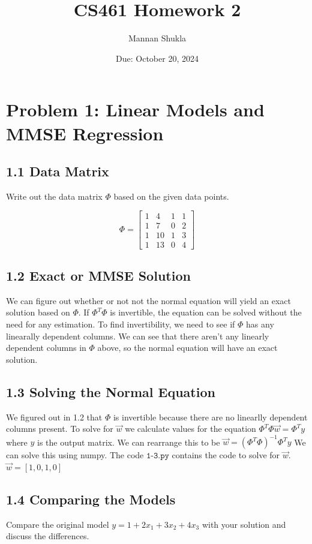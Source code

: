 \documentclass[12pt]{article}
\title{CS461 Homework 2}
\author{Mannan Shukla}
\date{Due: October 20, 2024}
\begin{document}
\maketitle

\section*{Problem 1: Linear Models and MMSE Regression}

\subsection*{1.1 Data Matrix}
Write out the data matrix \( \Phi \) based on the given data points.

\[
\Phi = \begin{bmatrix}
1 & 4 & 1 & 1 \\
1 & 7 & 0 & 2 \\
1 & 10 & 1 & 3 \\
1 & 13 & 0 & 4
\end{bmatrix}
\]

\subsection*{1.2 Exact or MMSE Solution}
We can figure out whether or not not the normal equation will yield an exact solution based on $\Phi$. If $\Phi^T \Phi$ is invertible, the equation can be solved without the need for any estimation. To find invertibility, we need to see if $\Phi$ has any linearally dependent columns. We can see that there aren't any linearly dependent columns in $\Phi$ above, so the normal equation will have an exact solution.

\subsection*{1.3 Solving the Normal Equation}
We figured out in 1.2 that $\Phi$ is invertible because there are no linearlly dependent columns present. To solve for $\vec{w}$ we calculate values for the equation $\Phi^T \Phi \vec{w} = \Phi^T y$  where $y$ is the output matrix. We can rearrange this to be $\vec{w} = (\Phi^T \Phi)^{-1} \Phi^T y$ We can solve this using numpy. The code $\texttt{1-3.py}$ contains the code to solve for $\vec{w}$. $\vec{w} = [1, 0, 1, 0]$

\subsection*{1.4 Comparing the Models}
Compare the original model \( y = 1 + 2x_1 + 3x_2 + 4x_3 \) with your solution and discuss the differences.
\end{document}
